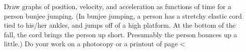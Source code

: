  Draw graphs of position, velocity, and acceleration as
functions of time for a person bunjee jumping. (In bunjee
jumping, a person has a stretchy elastic cord tied to
his/her ankles, and jumps off of a high platform. At the
bottom of the fall, the cord brings the person up short.
Presumably the person bounces up a little.)
Do your work on a photocopy or a printout of 
page <%
